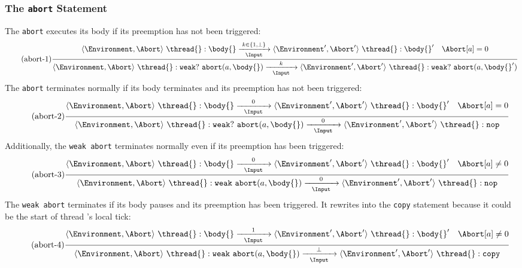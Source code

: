 \subsubsection{The \texttt{abort} Statement}
The \verb$abort$ executes its body \body{} if its preemption has not been triggered:
\begin{equation*}
	\tag{abort-1}
	\label{forec:abort-1}
	\frac{
			\langle \Environment, \Abort \rangle ~ \thread{}:\body{}
				\xrightarrow[~~\Input~~]{k \in \lbrace 1, \bot \rbrace} 
			\langle \Environment', \Abort' \rangle ~ \thread{}:\body{}'
			\quad
			\Abort[a] = 0
		}{
			\langle \Environment, \Abort \rangle ~ \thread{}:\mathtt{weak}?~\mathtt{abort}(a, \body{})
				\xrightarrow[~~\Input~~]{k} 
			\langle \Environment', \Abort' \rangle ~ \thread{}:\mathtt{weak}?~\mathtt{abort}(a, \body{}')
		}
\end{equation*}
The \verb$abort$ terminates normally if its body terminates and its preemption has not
been triggered:
\begin{equation*}
	\tag{abort-2}
	\label{forec:abort-2}
	\frac{
			\langle \Environment, \Abort \rangle ~ \thread{}:\body{}
				\xrightarrow[~~\Input~~]{0} 
			\langle \Environment', \Abort' \rangle ~ \thread{}:\body{}'
			\quad
			\Abort[a] = 0
		}{
			\langle \Environment, \Abort \rangle ~ \thread{}:\mathtt{weak}?~\mathtt{abort}(a, \body{})
				\xrightarrow[~~\Input~~]{0} 
			\langle \Environment', \Abort' \rangle ~ \thread{}:\mathtt{nop}
		}
\end{equation*}
Additionally, the \verb$weak abort$ terminates normally even
if its preemption has been triggered:
\begin{equation*}
	\tag{abort-3}
	\label{forec:abort-3}
	\frac{
			\langle \Environment, \Abort \rangle ~ \thread{}:\body{}
				\xrightarrow[~~\Input~~]{0} 
			\langle \Environment', \Abort' \rangle ~ \thread{}:\body{}'
			\quad
			\Abort[a] \neq 0
		}{
			\langle \Environment, \Abort \rangle ~ \thread{}:\mathtt{weak}~\mathtt{abort}(a, \body{})
				\xrightarrow[~~\Input~~]{0} 
			\langle \Environment', \Abort' \rangle ~ \thread{}:\mathtt{nop}
		}
\end{equation*}
The \verb$weak abort$ terminates if its body pauses and its preemption has been triggered. 
It rewrites into the \verb$copy$ statement because it could be the start of thread \thread{}'s 
local tick:
\begin{equation*}
	\tag{abort-4}
	\label{forec:abort-4}
	\frac{
			\langle \Environment, \Abort \rangle ~ \thread{}:\body{}
				\xrightarrow[~~\Input~~]{1} 
			\langle \Environment', \Abort' \rangle ~ \thread{}:\body{}'
			\quad
			\Abort[a] \neq 0
		}{
			\langle \Environment, \Abort \rangle ~ \thread{}:\mathtt{weak}~\mathtt{abort}(a, \body{})
				\xrightarrow[~~\Input~~]{\bot} 
			\langle \Environment', \Abort' \rangle ~ \thread{}:\mathtt{copy}
		}
\end{equation*}
